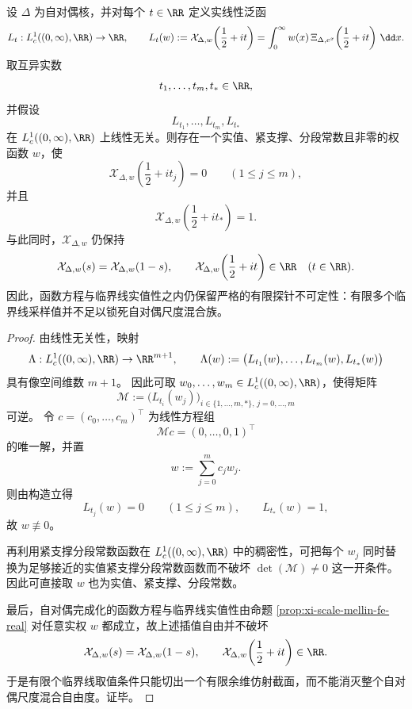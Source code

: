 \begin{theorem}[自对偶尺度混合中的有限余维临界插值自由度]\label{thm:conclusion-selfdual-scale-mellin-finite-codim-interpolation}
设 \(\Delta\) 为自对偶核，并对每个 \(t\in\RR\) 定义实线性泛函
\[
L_t:L^1_c((0,\infty),\RR)\to\RR,
\qquad
L_t(w):=
\mathcal X_{\Delta,w}\!\left(\frac12+it\right)
=
\int_0^\infty w(x)\,\Xi_{\Delta,e^x}\!\left(\frac12+it\right)\,\dd x.
\]
取互异实数
\[
t_1,\dots,t_m,t_\ast\in\RR,
\]
并假设
\[
L_{t_1},\dots,L_{t_m},L_{t_\ast}
\]
在 \(L^1_c((0,\infty),\RR)\) 上线性无关。则存在一个实值、紧支撑、分段常数且非零的权函数 \(w\)，使
\[
\mathcal X_{\Delta,w}\!\left(\frac12+it_j\right)=0
\qquad (1\le j\le m),
\]
并且
\[
\mathcal X_{\Delta,w}\!\left(\frac12+it_\ast\right)=1.
\]
与此同时，\(\mathcal X_{\Delta,w}\) 仍保持
\[
\mathcal X_{\Delta,w}(s)=\mathcal X_{\Delta,w}(1-s),
\qquad
\mathcal X_{\Delta,w}\!\left(\frac12+it\right)\in\RR
\quad (t\in\RR).
\]
因此，函数方程与临界线实值性之内仍保留严格的有限探针不可定性：有限多个临界线采样值并不足以锁死自对偶尺度混合族。
\end{theorem}
\begin{proof}
由线性无关性，映射
\[
\Lambda:L^1_c((0,\infty),\RR)\to \RR^{m+1},
\qquad
\Lambda(w):=
\bigl(L_{t_1}(w),\dots,L_{t_m}(w),L_{t_\ast}(w)\bigr)
\]
具有像空间维数 \(m+1\)。
因此可取 \(w_0,\dots,w_m\in L^1_c((0,\infty),\RR)\)，使得矩阵
\[
\mathcal M:=
\bigl(L_{t_i}(w_j)\bigr)_{i\in\{1,\dots,m,\ast\},\,j=0,\dots,m}
\]
可逆。
令 \(c=(c_0,\dots,c_m)^\top\) 为线性方程组
\[
\mathcal M c=(0,\dots,0,1)^\top
\]
的唯一解，并置
\[
w:=\sum_{j=0}^{m}c_jw_j.
\]
则由构造立得
\[
L_{t_j}(w)=0\qquad(1\le j\le m),
\qquad
L_{t_\ast}(w)=1,
\]
故 \(w\not\equiv 0\)。

再利用紧支撑分段常数函数在 \(L^1_c((0,\infty),\RR)\) 中的稠密性，可把每个 \(w_j\) 同时替换为足够接近的实值紧支撑分段常数函数而不破坏 \(\det(\mathcal M)\neq 0\) 这一开条件。
因此可直接取 \(w\) 也为实值、紧支撑、分段常数。

最后，自对偶完成化的函数方程与临界线实值性由命题 \ref{prop:xi-scale-mellin-fe-real} 对任意实权 \(w\) 都成立，故上述插值自由并不破坏
\[
\mathcal X_{\Delta,w}(s)=\mathcal X_{\Delta,w}(1-s),
\qquad
\mathcal X_{\Delta,w}\!\left(\frac12+it\right)\in\RR.
\]
于是有限个临界线取值条件只能切出一个有限余维仿射截面，而不能消灭整个自对偶尺度混合自由度。证毕。
\end{proof}

